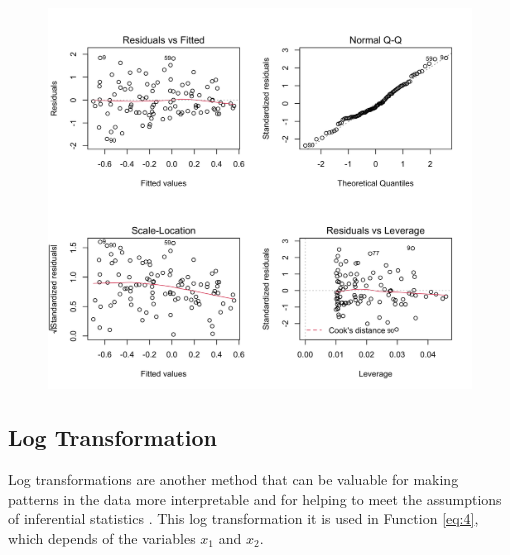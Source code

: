 \documentclass[10pt,leter,openany]{article}
\begin{document}
		\begin{figure}
		\begin{center}
			\includegraphics[scale=0.23]{extras/boxcox}
			\label{fig:boxcox_df2}
		\end{center}
	\end{figure}
		

	\subsection{Log Transformation}

		Log transformations are another method that can be valuable for making patterns in the data more interpretable and for helping to meet the assumptions of inferential statistics \cite{lane2003introduction}. This log transformation it is used in Function \ref{eq:4}, which depends of the variables $x_{1}$ and $ x_{2} $.
\end{document}
